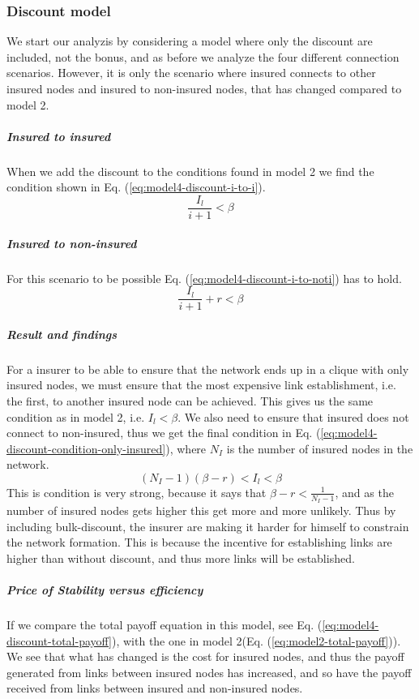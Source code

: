 \subsubsection{Discount model}
We start our analyzis by considering a model where only the discount are included, not the bonus, and as before we analyze the four different connection scenarios. However, it is only the scenario where insured connects to other insured nodes and insured to non-insured nodes, that has changed compared to model 2.
\subparagraph{Insured to insured}
When we add the discount to the conditions found in model 2 we find the condition shown in Eq. (\ref{eq:model4-discount-i-to-i}).
\begin{equation}
\frac{I_{l}}{i+1}<\beta
\label{eq:model4-discount-i-to-i}
\end{equation}
\subparagraph{Insured to non-insured}
For this scenario to be possible Eq. (\ref{eq:model4-discount-i-to-noti}) has to hold.
\begin{equation}
\frac{I_{l}}{i+1}+r<\beta
\label{eq:model4-discount-i-to-noti}
\end{equation}
\subparagraph{Result and findings}
For a insurer to be able to ensure that the network ends up in a clique with only insured nodes, we must ensure that the most expensive link establishment, i.e. the first, to another insured node can be achieved. This gives us the same condition as in model 2, i.e. $I_{l}<\beta$. 
We also need to ensure that insured does not connect to non-insured, thus we get the final condition in Eq. (\ref{eq:model4-discount-condition-only-insured}), where $N_{I}$ is the number of insured nodes in the network.
\begin{equation}
(N_{I}-1)(\beta-r)<I_{l}<\beta
\label{eq:model4-discount-condition-only-insured}
\end{equation}
This is condition is very strong, because it says that $\beta-r<\frac{1}{N_{I}-1}$, and as the number of insured nodes gets higher this get more and more unlikely. 
Thus by including bulk-discount, the insurer are making it harder for himself to constrain the network formation. This is because the incentive for establishing links are higher than without discount, and thus more links will be established.
\subparagraph{Price of Stability versus efficiency}
If we compare the total payoff equation in this model, see Eq. (\ref{eq:model4-discount-total-payoff}), with the one in model 2(Eq. (\ref{eq:model2-total-payoff})). We see that what has changed is the cost for insured nodes, and thus the payoff generated from links between insured nodes has increased, and so have the payoff received from links between insured and non-insured nodes. 
